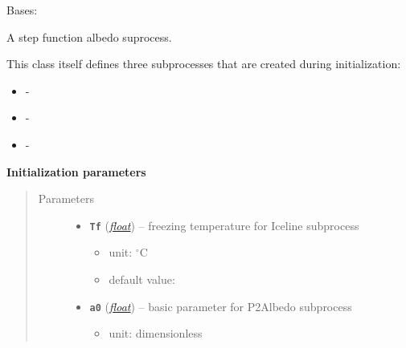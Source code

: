 \documentclass[letterpaper,10pt,english]{sphinxmanual}
\begin{document}

\begin{fulllineitems}
\label{api/climlab.surface:climlab.surface.albedo.StepFunctionAlbedo}
Bases: {\hyperref[api/climlab.process:climlab.process.diagnostic.DiagnosticProcess]{\emph{}}}

A step function albedo suprocess.

This class itself defines three subprocesses that are created during 
initialization:
\begin{itemize}
\item {} 
 - {\hyperref[api/climlab.surface:climlab.surface.albedo.Iceline]{\emph{}}}

\item {} 
 - {\hyperref[api/climlab.surface:climlab.surface.albedo.P2Albedo]{\emph{}}}

\item {} 
 - {\hyperref[api/climlab.surface:climlab.surface.albedo.ConstantAlbedo]{\emph{}}}

\end{itemize}

\textbf{Initialization parameters}
\begin{quote}\begin{description}
\item[{Parameters}] \leavevmode\begin{itemize}
\item {} 
\textbf{\texttt{Tf}} (\href{http://docs.python.org/2.7/library/functions.html\#float}{\emph{float}}) -- 
freezing temperature for Iceline subprocess
\begin{itemize}
\item {} 
unit: \(^{\circ} \textrm{C}\)

\item {} 
default value: 

\end{itemize}


\item {} 
\textbf{\texttt{a0}} (\href{http://docs.python.org/2.7/library/functions.html\#float}{\emph{float}}) -- 
basic parameter for P2Albedo subprocess
\begin{itemize}
\item {} 
unit: dimensionless


\end{itemize}
\end{itemize}
\end{description}
\end{quote}
\end{fulllineitems}
\end{document}
